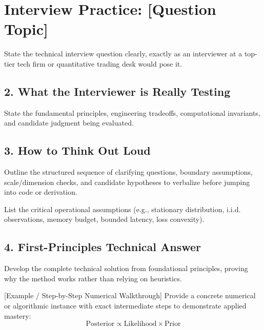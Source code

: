 \section{Interview Practice: [Question Topic]}

\begin{interviewbox}
State the technical interview question clearly, exactly as an interviewer at a top-tier tech firm or quantitative trading desk would pose it.
\end{interviewbox}

\subsection*{2. What the Interviewer is Really Testing}
State the fundamental principles, engineering tradeoffs, computational invariants, and candidate judgment being evaluated.

\subsection*{3. How to Think Out Loud}
Outline the structured sequence of clarifying questions, boundary assumptions, scale/dimension checks, and candidate hypotheses to verbalize before jumping into code or derivation.

\begin{assumptionbox}
List the critical operational assumptions (e.g., stationary distribution, i.i.d. observations, memory budget, bounded latency, loss convexity).
\end{assumptionbox}

\subsection*{4. First-Principles Technical Answer}
Develop the complete technical solution from foundational principles, proving why the method works rather than relying on heuristics.

\begin{numericalexample}{[Example / Step-by-Step Numerical Walkthrough]}
Provide a concrete numerical or algorithmic instance with exact intermediate steps to demonstrate applied mastery:
\[
  \text{Posterior} \propto \text{Likelihood} \times \text{Prior}
\]
\end{numericalexample}

